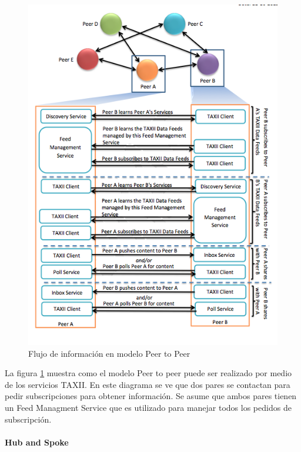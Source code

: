 \begin{figure}[ht!]
  \centering
  \includegraphics[scale=0.55]{./images/PeerToPeerModel.png}
    \caption{Flujo de información en modelo Peer to Peer \protect\cite{b1}}
  \label{fig.peertopeermodel}
\end{figure}

La figura \ref{fig.peertopeermodel} muestra como el modelo Peer to peer puede ser realizado por 
medio de los servicios TAXII. En este diagrama se ve que dos pares se contactan 
para pedir subscripciones para obtener información. Se asume que ambos pares 
tienen un Feed Managment Service que es utilizado para manejar todos los 
pedidos de subscripción.
\newpage

\paragraph{Hub and Spoke}\ \\

